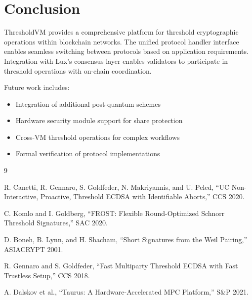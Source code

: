 \documentclass[11pt,twocolumn]{article}
\begin{document}
\section{Conclusion}

ThresholdVM provides a comprehensive platform for threshold cryptographic operations within blockchain networks. The unified protocol handler interface enables seamless switching between protocols based on application requirements. Integration with Lux's consensus layer enables validators to participate in threshold operations with on-chain coordination.

Future work includes:
\begin{itemize}
\item Integration of additional post-quantum schemes
\item Hardware security module support for share protection
\item Cross-VM threshold operations for complex workflows
\item Formal verification of protocol implementations
\end{itemize}


\begin{thebibliography}{9}

R. Canetti, R. Gennaro, S. Goldfeder, N. Makriyannis, and U. Peled, ``UC Non-Interactive, Proactive, Threshold ECDSA with Identifiable Aborts,'' CCS 2020.

C. Komlo and I. Goldberg, ``FROST: Flexible Round-Optimized Schnorr Threshold Signatures,'' SAC 2020.

D. Boneh, B. Lynn, and H. Shacham, ``Short Signatures from the Weil Pairing,'' ASIACRYPT 2001.

R. Gennaro and S. Goldfeder, ``Fast Multiparty Threshold ECDSA with Fast Trustless Setup,'' CCS 2018.

A. Dalskov et al., ``Taurus: A Hardware-Accelerated MPC Platform,'' S\&P 2021.

\end{thebibliography}
\end{document}
